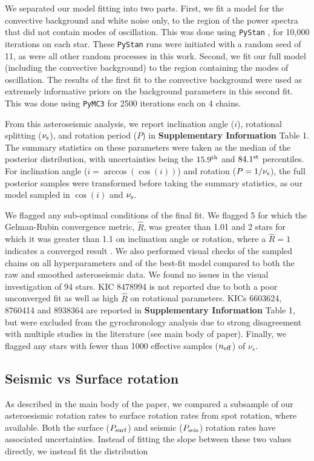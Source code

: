 \documentclass[12pt]{article}
\begin{document}
We separated our model fitting into two parts. First, we fit a model for the convective background and white noise only, to the region of the power spectra that did not contain modes of oscillation. This was done using \texttt{PyStan} \cite{vanhoey+2013, carpenter+2017}, for 10,000 iterations on each star. These \texttt{PyStan} runs were initiated with a random seed of 11, as were all other random processes in this work. Second, we fit our full model (including the convective background) to the region containing the modes of oscillation. The results of the first fit to the convective background were used as extremely informative priors on the background parameters in this second fit. This was done using \texttt{PyMC3} \cite{vanderwalt+2011, salvatier+2016, thetheanodevelopmentteam+2016} for 2500 iterations each on 4 chains.

From this asteroseismic analysis, we report inclination angle ($i$), rotational splitting ($\nu_{\rm s}$), and rotation period ($P$) in \textbf{Supplementary Information} Table 1. The summary statistics on these parameters were taken as the median of the posterior distribution, with uncertainties being the $15.9^{\rm th}$ and $84.1^{\rm st}$ percentiles. For inclination angle ($i = \arccos(\cos(i))$) and rotation ($P = 1/\nu_{\rm s}$), the full posterior samples were transformed before taking the summary statistics, as our model sampled in $\cos(i)$ and $\nu_{\rm s}$.

We flagged any sub-optimal conditions of the final fit. We flagged 5 for which the Gelman-Rubin convergence metric, $\hat{R}$, was greater than 1.01 and 2 stars for which it was greater than 1.1 on inclination angle or rotation, where a $\hat{R} = 1$ indicates a converged result \cite{gelman+rubin1992}. We also performed visual checks of the sampled chains on all hyperparameters and of the best-fit model compared to both the raw and smoothed asteroseismic data. We found no issues in the visual investigation of 94 stars. KIC 8478994 is not reported due to both a poor unconverged fit as well as high $\hat{R}$ on rotational parameters. KICs 6603624, 8760414 and 8938364 are reported in  \textbf{Supplementary Information} Table 1, but were excluded from the gyrochronology analysis due to strong disagreement with multiple studies in the literature (see main body of paper). Finally, we flagged any stars with fewer than 1000 effective samples ($n_{\rm eff}$) of $\nu_s$.

\subsection{Seismic vs Surface rotation}
As described in the main body of the paper, we compared a subsample of our asteroesismic rotation rates to surface rotation rates from spot rotation, where available. Both the surface ($P_{\rm surf}$) and seismic ($P_{\rm seis}$) rotation rates have associated uncertainties. Instead of fitting the slope between these two values directly, we instead fit the distribution
\end{document}

